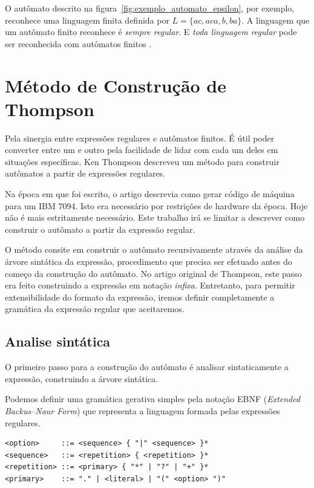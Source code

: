 \documentclass[a4paper,12pt,oneside,onecolumn]{uerj}
\begin{document}
O autômato descrito na figura~\ref{fig:exemplo_automato_epsilon}, por exemplo, reconhece uma linguagem finita definida por $L = \{ac, aca, b, ba\}$. A linguagem que um autômato finito reconhece é \emph{sempre regular}. E \emph{toda linguagem regular} pode ser reconhecida com autômatos finitos \cite{bib:Kleene56}.

\section{Método de Construção de Thompson}

Pela sinergia entre expressões regulares e autômatos finitos. É útil poder converter entre um e outro pela facilidade de lidar com cada um deles em situações específicas. Ken Thompson \cite{bib:Thompson68} descreveu um método para construir autômatos a partir de expressões regulares.

Na época em que foi escrito, o artigo descrevia como gerar código de máquina para um IBM 7094. Isto era necessário por restrições de hardware da época. Hoje não é mais estritamente necessário. Este trabalho irá se limitar a descrever como construir o autômato a partir da expressão regular.

O método consite em construir o autômato recursivamente através da análise da árvore sintática da expressão, procedimento que precisa ser efetuado antes do começo da construção do autômato. No artigo original de Thompson, este passo era feito construindo a expressão em notação \emph{infixa}. Entretanto, para permitir extensibilidade do formato da expressão, iremos definir completamente a gramática da expressão regular que aceitaremos.

\subsection{Analise sintática}

O primeiro passo para a construção do autômato é analisar sintaticamente a expressão, construindo a árvore sintática. 

Podemos definir uma gramática gerativa simples pela notação EBNF (\emph{Extended Backus–Naur Form}) que representa a linguagem formada pelas expressões regulares.

\begin{verbatim}
<option>     ::= <sequence> { "|" <sequence> }*
<sequence>   ::= <repetition> { <repetition> }*
<repetition> ::= <primary> { "*" | "?" | "+" }*
<primary>    ::= "." | <literal> | "(" <option> ")"
\end{verbatim}
\end{document}
